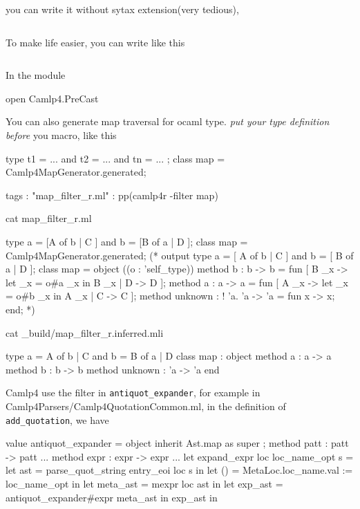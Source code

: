 \documentclass[svgnames,12pt,a4paper]{report}
\begin{document}
\inputminted[firstline=1,lastline=9]{ocaml}{camlp4/code/ast_add_zero.ml}
you can write it without sytax extension(very tedious),
\inputminted[firstline=11,lastline=31]{ocaml}{camlp4/code/ast_add_zero.ml}
To make life easier, you can write like this 
\inputminted[firstline=32,lastline=38]{ocaml}{camlp4/code/ast_add_zero.ml}


In the module 
\begin{bluecode}
open Camlp4.PreCast
\end{bluecode}


You can also generate map traversal for ocaml type. \emph{put your
  type definition before} you macro, like this


\begin{bluecode}
type t1 = ...
and t2 = ...
and tn = ... ;
class map = Camlp4MapGenerator.generated;
\end{bluecode}


\begin{bluetext}
tags : "map_filter_r.ml" : pp(camlp4r -filter map)
\end{bluetext}

\begin{bluetext}
cat map_filter_r.ml
\end{bluetext}

\begin{bluecode}
type a = [A of b | C ]
and b = [B of a | D ]; 
class map = Camlp4MapGenerator.generated;
(* output 
type a = [ A of b | C ] and b = [ B of a | D ];
class map =
  object ((o : 'self_type))
    method b : b -> b = fun [ B _x -> let _x = o#a _x in B _x | D -> D ];
    method a : a -> a = fun [ A _x -> let _x = o#b _x in A _x | C -> C ];
    method unknown : ! 'a. 'a -> 'a = fun x -> x;
  end;
*)
\end{bluecode}

\begin{bluetext}
cat _build/map_filter_r.inferred.mli 
\end{bluetext}

\begin{bluecode}
type a = A of b | C
and b = B of a | D
class map :
  object method a : a -> a method b : b -> b method unknown : 'a -> 'a end
\end{bluecode}

Camlp4 use the filter in \verb|antiquot_expander|, for example in
Camlp4Parsers/Camlp4QuotationCommon.ml, in the definition of
\verb|add_quotation|, we have


\begin{bluecode}
value antiquot_expander = object
  inherit Ast.map as super ;
  method patt : patt -> patt ...
  method expr : expr -> expr ...
let expand_expr loc loc_name_opt s =
  let ast = parse_quot_string entry_eoi loc s in
  let () = MetaLoc.loc_name.val := loc_name_opt in
  let meta_ast = mexpr loc ast in
  let exp_ast = antiquot_expander#expr meta_ast in
  exp_ast in
\end{bluecode}
\end{document}
